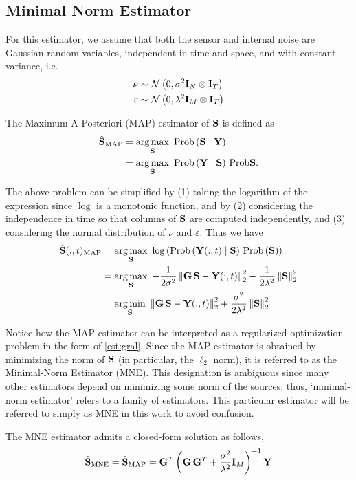 \subsection{Minimal Norm Estimator}

For this estimator, we assume that both the sensor and internal noise are Gaussian random variables, independent in time and space, and with constant variance, i.e.
\begin{align}
\nu &\sim \mathcal{N}\left( 0, \sigma^2 \mathbf{I}_N \otimes \mathbf{I}_T   \right) \\
\varepsilon &\sim \mathcal{N}\left( 0, \lambda^2 \mathbf{I}_M \otimes \mathbf{I}_T \right)
\end{align}

The Maximum A Posteriori (MAP) estimator of $\mathbf{S}$ is defined as
\begin{align}
\hat{\mathbf{S}}_\text{MAP} 
&=
\operatorname*{arg\,max}_{\mathbf{S}}\,\, \text{Prob}\left(  \mathbf{S} \;\middle|\; \mathbf{Y}  \right)
\nonumber \\
&=
\operatorname*{arg\,max}_{\mathbf{S}}\,\, \text{Prob}\left(  \mathbf{Y} \;\middle|\; \mathbf{S}  \right)\, \text{Prob}{\mathbf{S}}.
\end{align}

The above problem can be simplified by (1) taking the logarithm of the expression since $\log$ is a monotonic function, and by (2) considering the independence in time so that columns of $\mathbf{S}$ are computed independently, and (3) considering the normal distribution of $\nu$ and $\varepsilon$.
%
Thus we have
\begin{align}
\hat{\mathbf{S}}(:,t)_\text{MAP} 
&=
\operatorname*{arg\,max}_{\mathbf{S}} \,\, \log\left(  \text{Prob}\left(  \mathbf{Y}(:,t) \;\middle|\; \mathbf{S}  \right)\, \text{Prob}\left( \mathbf{S} \right)  \right)
\nonumber \\
&=
\operatorname*{arg\,max}_{\mathbf{S}} \,\,
- \frac{1}{2\sigma^2} \left\lVert \mathbf{G}\, \mathbf{S} - \mathbf{Y}(:,t) \right\rVert_2^2 
- \frac{1}{2\lambda^2} \left\lVert \mathbf{S}  \right\rVert_2^2 
\nonumber \\
&=
\operatorname*{arg\,min}_{\mathbf{S}} \,\,
\left\lVert \mathbf{G}\, \mathbf{S} - \mathbf{Y}(:,t) \right\rVert_2^2 
+ \frac{\sigma^2}{2\lambda^2} \left\lVert \mathbf{S}  \right\rVert_2^2 
\end{align}

Notice how the MAP estimator can be interpreted as a regularized optimization problem in the form of \eqref{est:gral}.
%
Since the MAP estimator is obtained by minimizing the norm of $\mathbf{S}$ (in particular, the $\ell_2$ norm), it is referred to as the Minimal-Norm Estimator (MNE).
%
This designation is ambiguous since many other estimators depend on minimizing some norm of the sources; thus, `minimal-norm estimator' refers to a family of estimators. 
%
This particular estimator will be referred to simply as MNE in this work to avoid confusion.

The MNE estimator admits a closed-form solution as follows,
\begin{equation}
\hat{\mathbf{S}}_\text{MNE}
=
\hat{\mathbf{S}}_\text{MAP}
=
\mathbf{G}^T\left(  \mathbf{G}\, \mathbf{G}^T + \frac{\sigma^2}{\lambda^2}\mathbf{I}_M  \right)^{-1} \mathbf{Y}
\end{equation}

